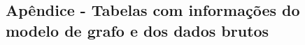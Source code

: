 
\chapter{}\label{cap:apendicea}


\section{Apêndice - Tabelas com informações do modelo de grafo e dos dados brutos}\label{sec:secaoapendicea}








